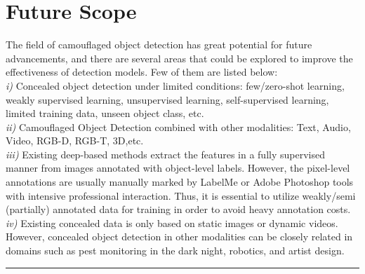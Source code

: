 \vspace{1cm}
\section{{{\fontsize{17}{21}\selectfont \textbf{Future Scope}}}}
\setlength{\columnsep}{1.5cm}

\begin{multicols}{2}
The field of camouflaged object detection has great potential for future advancements, and there are several areas that could be explored to improve the effectiveness of detection models. Few of them are listed below: \\

\textit{i)} Concealed object detection under limited conditions: few/zero-shot learning, weakly supervised learning, unsupervised learning, self-supervised learning, limited training data, unseen object class, etc.\\

\textit{ii)} Camouflaged Object Detection combined with other
modalities: Text, Audio, Video\cite{ma2022structured}, RGB-D, RGB-T, 3D,etc.\\

\textit{iii)} Existing deep-based methods extract the features in a fully supervised manner from images annotated with object-level labels. However, the pixel-level annotations are usually manually marked by LabelMe or Adobe Photoshop tools with intensive professional interaction. Thus, it is essential to utilize weakly/semi (partially) annotated data for training in order to avoid heavy annotation costs.\\

\textit{iv)} Existing concealed data is only based on static images or dynamic videos. However, concealed object detection in other modalities can be closely related in domains such as pest monitoring in the dark night, robotics, and artist design.
\end{multicols}

\vspace{0.5cm}
{\color{gray}\hrule}
\vspace{0.5cm}